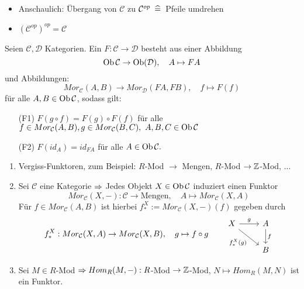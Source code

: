 \begin{anm}
	\begin{itemize}
		\item  Anschaulich: Übergang von $\mathcal{C}$ zu  $\mathcal{C}^{op} \ \, \widehat{=} \, $ Pfeile umdrehen
		\item $(\mathcal{C}^{op})^{op} = \mathcal{C}$
	\end{itemize}
\end{anm}
\begin{df}\label{4.4}
	Seien $\mathcal{C}, \mathcal{D} $ Kategorien. Ein  $F: \mathcal{C} \to \mathcal{D} $ besteht aus einer Abbildung $$ \text{Ob}\,\mathcal{C} \to \text{Ob}(\mathcal{D}), \quad A \mapsto FA$$
	und Abbildungen: $$ Mor_{\mathcal{C}}(A,B) \to Mor_{\mathcal{D}}(FA,FB), \quad f \mapsto F(f) $$ für alle $A,B \in \text{Ob}\,\mathcal{C}$, sodass gilt:
	\begin{enumerate}
		\item[(F1)] $F(g \circ f) = F(g) \circ F(f) $ für alle $ f \in Mor_{\mathcal{C}}(A,B), g\in Mor_{\mathcal{C}}(B,C), \ A,B,C \in \text{Ob}\,\mathcal{C}$
		\item[(F2)] $F(id_A) =id_{FA} $ für alle $A \in \text{Ob}\,\mathcal{C}.$
	\end{enumerate}
\end{df}
\begin{bsp}
	\begin{enumerate} [label= \alph*)]
		\item Vergiss-Funktoren, zum Beispiel: $R$-Mod $\to $ Mengen, $R$-Mod $\to \mathbb{Z}$-Mod, ...
		\item Sei $\mathcal{C}$ eine Kategorie $\Rightarrow$ Jedes Objekt $X \in \text{Ob}\,\mathcal{C}$ induziert einen Funktor $$Mor_{\mathcal{C}}(X,-): \mathcal{C} \to \text{Mengen}, \quad A \mapsto Mor_{\mathcal{C}}(X,A) $$
		Für $f \in Mor_{\mathcal{C}}(A,B) $ ist hierbei $f_{\ast}^{X} := Mor_{\mathcal{C}}(X,-)(f)$ gegeben durch $$ f_{\ast}^{X}: Mor_{\mathcal{C}}(X,A) \to Mor_{\mathcal{C}}(X,B), \quad g \mapsto f \circ g\qquad \begin{tikzcd}
		X \arrow{r}{g} \arrow[swap]{rd}{f_*^X(g)} & A \arrow{d}{f} \\ & B
		\end{tikzcd} $$
		\item Sei $M \in R$-Mod $\Rightarrow Hom_R(M,-): R$-Mod $\to \mathbb{Z}$-Mod, $N \mapsto Hom_R(M,N) $ ist ein Funktor.
	\end{enumerate}
\end{bsp}
